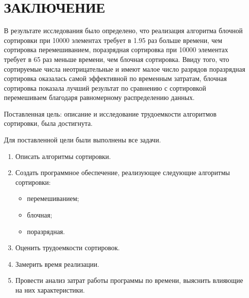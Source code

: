 \chapter*{\hfill{\centering  ЗАКЛЮЧЕНИЕ}\hfill}

В результате исследования было определено, что  реализация алгоритма  блочной сортировки при 10000 элементах требует в 1.95 раз больше  времени, чем сортировка перемешиванием, поразрядная сортировка при 10000 элементах требует в 65 раз меньше времени, чем блочная сортировка. Ввиду того, что сортируемые числа неотрицательные и имеют малое число разрядов поразрядная сортировка оказалась самой эффективной по временным затратам, блочная сортировка показала лучший результат по сравнению с сортировкой перемешиваем благодаря равномерному распределению данных.




Поставленная цель: описание и исследование трудоемкости алгоритмов сортировки, была достигнута.

Для поставленной цели были выполнены все задачи.
\begin{enumerate}
	\item Описать алгоритмы сортировки.
	\item Создать программное обеспечение, реализующее следующие алгоритмы сортировки:
	\begin{itemize}
		\item перемешиванием;
		\item блочная;
		\item поразрядная.
	\end{itemize}
	\item Оценить трудоемкости сортировок.
	\item Замерить время реализации.
	\item Провести анализ затрат работы программы по времени, выяснить влияющие на них характеристики.
\end{enumerate}
